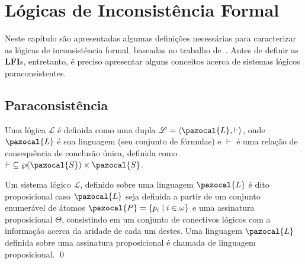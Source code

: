 \chapter{Lógicas de Inconsistência Formal}
\label{cap:LFIs}
Neste capítulo são apresentadas algumas definições necessárias para caracterizar as lógicas de inconsistência formal, baseadas no trabalho de~. Antes de definir as \textbf{LFI}s, entretanto, é preciso apresentar alguns conceitos acerca de sistemas lógicos paraconsistentes.

\section{Paraconsistência}
\label{def:paracons}
Uma lógica $\mathcal{L}$ é definida como uma dupla $\mathcal{L} = \langle \pazocal{L},\vdash \rangle$, onde $\pazocal{L}$ é sua linguagem (seu conjunto de fórmulas) e $\vdash$ é uma relação de consequência de conclusão única, definida como $\vdash \;\subseteq \wp(\pazocal{S})\times\pazocal{S}$. 

\begin{definicao}
    \label{def:proposicional}
    Um sistema lógico $\mathcal{L}$, definido sobre uma linguagem $\pazocal{L}$ é dito proposicional caso $\pazocal{L}$ seja definida a partir de um conjunto enumerável de átomos $\pazocal{P} = \{p_{i} \;| \; i \in \omega \}$ e uma assinatura proposicional $\Theta$, consistindo em um conjunto de conectivos lógicos com a informação acerca da aridade de cada um destes. Uma linguagem $\pazocal{L}$ definida sobre uma assinatura proposicional é chamada de linguagem proposicional. \qed
\end{definicao}

